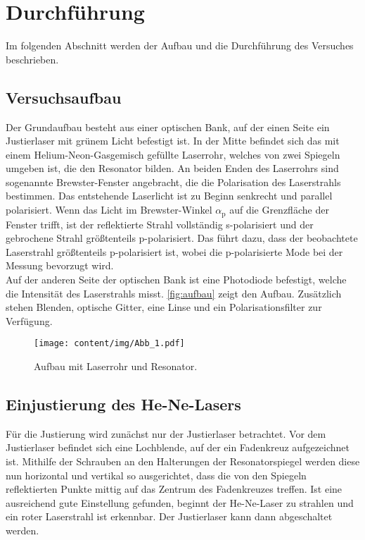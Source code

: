 \section{Durchführung}
\label{sec:durchfuehrung}

    Im folgenden Abschnitt werden der Aufbau und die Durchführung des Versuches beschrieben.

\subsection{Versuchsaufbau}
\label{sec:versuchsaufbau}

    Der Grundaufbau besteht aus einer optischen Bank,
    auf der einen Seite ein Justierlaser mit grünem Licht befestigt ist.
    In der Mitte befindet sich das mit einem Helium-Neon-Gasgemisch gefüllte Laserrohr,
    welches von zwei Spiegeln umgeben ist,
    die den Resonator bilden.
    An beiden Enden des Laserrohrs sind sogenannte Brewster-Fenster angebracht,
    die die Polarisation des Laserstrahls bestimmen.
    Das entstehende Laserlicht ist zu Beginn senkrecht und parallel polarisiert.
    Wenn das Licht im Brewster-Winkel $\alpha_\text{p}$ auf die Grenzfläche der Fenster trifft,
    ist der reflektierte Strahl vollständig s-polarisiert und der gebrochene Strahl größtenteils p-polarisiert.
    Das führt dazu,
    dass der beobachtete Laserstrahl größtenteils p-polarisiert ist,
    wobei die p-polarisierte Mode bei der Messung bevorzugt wird.\\
    Auf der anderen Seite der optischen Bank ist eine Photodiode befestigt,
    welche die Intensität des Laserstrahls misst.
    \autoref{fig:aufbau} zeigt den Aufbau.
    Zusätzlich stehen Blenden, optische Gitter, eine Linse und ein Polarisationsfilter zur Verfügung.

    \begin{figure}
      \centering
      \texttt{[image: content/img/Abb\_1.pdf]}
      \caption{Aufbau mit Laserrohr und Resonator. \cite{versuchsanleitung}}
      \label{fig:aufbau}
    \end{figure}


\subsection{Einjustierung des He-Ne-Lasers}

    Für die Justierung wird zunächst nur der Justierlaser betrachtet.
    Vor dem Justierlaser befindet sich eine Lochblende,
    auf der ein Fadenkreuz aufgezeichnet ist.
    Mithilfe der Schrauben an den Halterungen der Resonatorspiegel werden diese nun horizontal und vertikal so ausgerichtet,
    dass die von den Spiegeln reflektierten Punkte mittig auf das Zentrum des Fadenkreuzes treffen.
    Ist eine ausreichend gute Einstellung gefunden,
    beginnt der He-Ne-Laser zu strahlen
    und ein roter Laserstrahl ist erkennbar.
    Der Justierlaser kann dann abgeschaltet werden.


